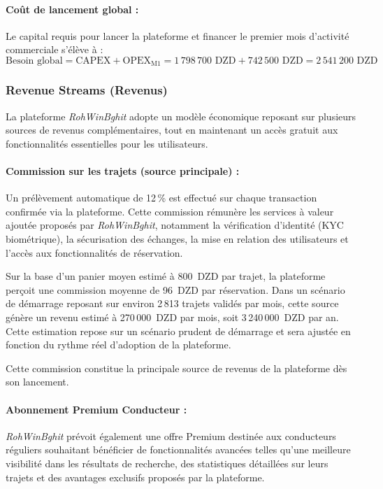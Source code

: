 \paragraph{Coût de lancement global :}
Le capital requis pour lancer la plateforme et financer le premier mois d'activité commerciale s'élève à :
\[ \text{Besoin global} = \text{CAPEX} + \text{OPEX}_{\text{M1}} = 1\,798\,700\text{ DZD} + 742\,500\text{ DZD} = 2\,541\,200\text{ DZD} \]

\subsubsection{Revenue Streams (Revenus)}

La plateforme \textit{RohWinBghit} adopte un modèle économique reposant sur plusieurs sources de revenus complémentaires, tout en maintenant un accès gratuit aux fonctionnalités essentielles pour les utilisateurs.

\paragraph{Commission sur les trajets (source principale) :}
Un prélèvement automatique de 12\,\% est effectué sur chaque transaction confirmée via la plateforme. Cette commission rémunère les services à valeur ajoutée proposés par \textit{RohWinBghit}, notamment la vérification d'identité (KYC biométrique), la sécurisation des échanges, la mise en relation des utilisateurs et l'accès aux fonctionnalités de réservation.

Sur la base d'un panier moyen estimé à 800~DZD par trajet, la plateforme perçoit une commission moyenne de 96~DZD par réservation. Dans un scénario de démarrage reposant sur environ 2\,813 trajets validés par mois, cette source génère un revenu estimé à 270\,000~DZD par mois, soit 3\,240\,000~DZD par an. Cette estimation repose sur un scénario prudent de démarrage et sera ajustée en fonction du rythme réel d'adoption de la plateforme.

Cette commission constitue la principale source de revenus de la plateforme dès son lancement.

\paragraph{Abonnement Premium Conducteur :}
\textit{RohWinBghit} prévoit également une offre Premium destinée aux conducteurs réguliers souhaitant bénéficier de fonctionnalités avancées telles qu'une meilleure visibilité dans les résultats de recherche, des statistiques détaillées sur leurs trajets et des avantages exclusifs proposés par la plateforme.

